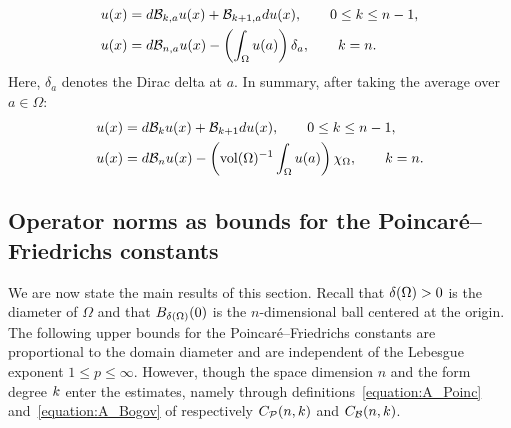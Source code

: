 \documentclass[10pt,a4paper]{article}
\begin{document}
\begin{align*}
    u(x) &= d {\mathcal B}_{k,a} u(x) + {\mathcal B}_{k+1,a} d u(x), \qquad 0 \leq k \leq n-1,
    \\
    u(x) &= d {\mathcal B}_{n,a} u(x) - \left( \int_{\Omega} u(a) \right) \delta_a, \qquad k = n.
\end{align*}
Here, $\delta_a$ denotes the Dirac delta at $a$. 
In summary, after taking the average over $a \in \Omega$:
\begin{align}\label{math:hodgedecomposition:bogov}
    u(x) &= d {\mathcal B}_{k} u(x) + {\mathcal B}_{k+1} d u(x), \qquad 0 \leq k \leq n-1,
    \\
    u(x) &= d {\mathcal B}_{n} u(x) - \left( \operatorname{vol}(\Omega)^{-1} \int_{\Omega} u(a) \right) \chi_{\Omega}, \qquad k = n.
\end{align}


\subsection{Operator norms as bounds for the Poincar\'e--Friedrichs constants}

We are now state the main results of this section. 
Recall that ${\delta}(\Omega) > 0$ is the diameter of $\Omega$ and that $B_{{\delta}(\Omega)}(0)$ is the $n$-dimensional ball centered at the origin.
The following upper bounds for the Poincar\'e--Friedrichs constants are proportional to the domain diameter and are independent of the Lebesgue exponent $1 \leq p \leq \infty$.
However, though the space dimension $n$ and the form degree $k$ enter the estimates, 
namely through definitions~\eqref{equation:A_Poinc} and~\eqref{equation:A_Bogov} of respectively $C_{{\mathcal P}}(n,k)$ and $C_{{\mathcal B}}(n,k)$. 
\end{document}
